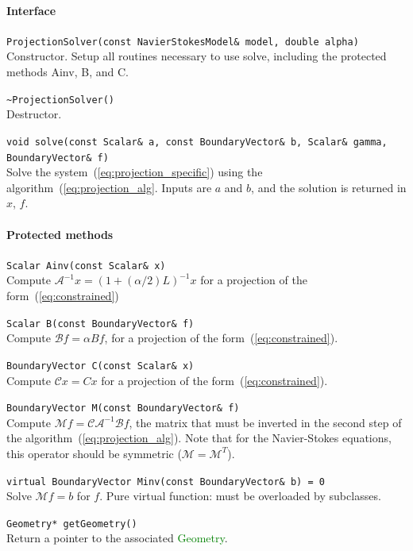 \documentclass[11pt]{article}
\def\class#1{\textcolor{green}{\ttfamily\small #1}} %
\def\fn#1{{\ttfamily\small #1}} %
\let\code\lstinline
\begin{document}
\paragraph{Interface}
\begin{description}
	\item \code|ProjectionSolver(const NavierStokesModel& model, double alpha)|\\
		Constructor.  Setup all routines necessary to use \fn{solve}, including the protected methods \fn{Ainv}, \fn{B}, and \fn{C}.
	\item \code|~ProjectionSolver()|\\
		Destructor.
	\item \code|void solve(const Scalar& a, const BoundaryVector& b, Scalar& gamma, BoundaryVector& f)|\\
	 	Solve the system~(\ref{eq:projection_specific}) using the algorithm~(\ref{eq:projection_alg}.  Inputs are $a$ and $b$, and the solution is returned in $x$, $f$.
\end{description}
\paragraph{Protected methods}
\begin{description}
	\item \code|Scalar Ainv(const Scalar& x)|\\
		Compute $\mathcal{A}^{-1}x=(1+(\alpha/2)L)^{-1}x$ for a projection of the form~(\ref{eq:constrained})
	\item \code|Scalar B(const BoundaryVector& f)|\\
		Compute $\mathcal{B}f=\alpha Bf$, for a projection of the form~(\ref{eq:constrained}).
	\item \code|BoundaryVector C(const Scalar& x)|\\
		Compute $\mathcal{C}x=Cx$ for a projection of the form~(\ref{eq:constrained}).
	\item \code|BoundaryVector M(const BoundaryVector& f)|\\
		Compute $\mathcal{M}f=\mathcal{C}\mathcal{A}^{-1}\mathcal{B}f$, the matrix that must be inverted in the second step of the algorithm~(\ref{eq:projection_alg}).  Note that for the Navier-Stokes equations, this operator should be symmetric ($\mathcal{M}=\mathcal{M}^T$).
	\item \code|virtual BoundaryVector Minv(const BoundaryVector& b) = 0|\\
		Solve $\mathcal{M}f=b$ for $f$.  Pure virtual function: must be overloaded by subclasses.
	\item \code|Geometry* getGeometry()|\\
		Return a pointer to the associated \class{Geometry}.
\end{description}
\end{document}
